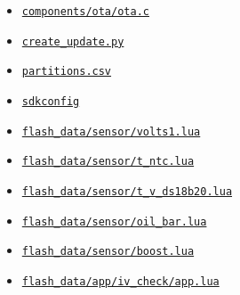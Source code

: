 \begin{itemize}
\item \href{https://github.com/Sgw32/iv-evo-fw/blob/3260783532b3d4ad8529b23f4e907c0a6ab03262/components/ota/ota.c}{\nolinkurl{components/ota/ota.c}}
\item \href{https://github.com/Sgw32/iv-evo-fw/blob/3260783532b3d4ad8529b23f4e907c0a6ab03262/create_update.py}{\nolinkurl{create_update.py}}
\item \href{https://github.com/Sgw32/iv-evo-fw/blob/3260783532b3d4ad8529b23f4e907c0a6ab03262/partitions.csv}{\nolinkurl{partitions.csv}}
\item \href{https://github.com/Sgw32/iv-evo-fw/blob/3260783532b3d4ad8529b23f4e907c0a6ab03262/sdkconfig}{\nolinkurl{sdkconfig}}
\item \href{https://github.com/Sgw32/iv-evo-fw/blob/3260783532b3d4ad8529b23f4e907c0a6ab03262/flash_data/sensor/volts1.lua}{\nolinkurl{flash_data/sensor/volts1.lua}}
\item \href{https://github.com/Sgw32/iv-evo-fw/blob/3260783532b3d4ad8529b23f4e907c0a6ab03262/flash_data/sensor/t_ntc.lua}{\nolinkurl{flash_data/sensor/t_ntc.lua}}
\item \href{https://github.com/Sgw32/iv-evo-fw/blob/3260783532b3d4ad8529b23f4e907c0a6ab03262/flash_data/sensor/t_v_ds18b20.lua}{\nolinkurl{flash_data/sensor/t_v_ds18b20.lua}}
\item \href{https://github.com/Sgw32/iv-evo-fw/blob/3260783532b3d4ad8529b23f4e907c0a6ab03262/flash_data/sensor/oil_bar.lua}{\nolinkurl{flash_data/sensor/oil_bar.lua}}
\item \href{https://github.com/Sgw32/iv-evo-fw/blob/3260783532b3d4ad8529b23f4e907c0a6ab03262/flash_data/sensor/boost.lua}{\nolinkurl{flash_data/sensor/boost.lua}}
\item \href{https://github.com/Sgw32/iv-evo-fw/blob/3260783532b3d4ad8529b23f4e907c0a6ab03262/flash_data/app/iv_check/app.lua}{\nolinkurl{flash_data/app/iv_check/app.lua}}
\end{itemize}
